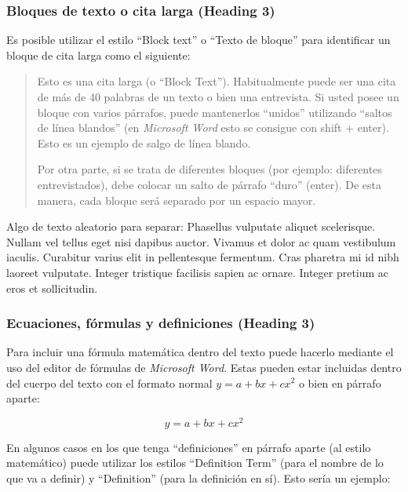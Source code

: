 \documentclass[
    a4paper,%
    DIV=calc,%
    abstract=true%
  ]{scrartcl}%
\begin{document}
  \subsubsection{Bloques de texto o cita larga (Heading
  3)}\label{bloques-de-texto-o-cita-larga-heading-3}

  Es posible utilizar el estilo ``Block text'' o ``Texto de bloque''
  para identificar un bloque de cita larga como el siguiente:

  \begin{quote}
  Esto es una cita larga (o ``Block Text''). Habitualmente puede ser una
  cita de más de 40 palabras de un texto o bien una entrevista. Si usted
  posee un bloque con varios párrafos, puede mantenerlos ``unidos''
  utilizando ``saltos de línea blandos'' (en \emph{Microsoft Word} esto
  se consigue con shift + enter).\\
  Esto es un ejemplo de salgo de línea blando.

  Por otra parte, si se trata de diferentes bloques (por ejemplo:
  diferentes entrevistados), debe colocar un salto de párrafo ``duro''
  (enter). De esta manera, cada bloque será separado por un espacio
  mayor.
  \end{quote}

  Algo de texto aleatorio para separar: Phasellus vulputate aliquet
  scelerisque. Nullam vel tellus eget nisi dapibus auctor. Vivamus et
  dolor ac quam vestibulum iaculis. Curabitur varius elit in
  pellentesque fermentum. Cras pharetra mi id nibh laoreet vulputate.
  Integer tristique facilisis sapien ac ornare. Integer pretium ac eros
  et sollicitudin.

  \subsubsection{Ecuaciones, fórmulas y definiciones (Heading
  3)}\label{ecuaciones-fuxf3rmulas-y-definiciones-heading-3}

  Para incluir una fórmula matemática dentro del texto puede hacerlo
  mediante el uso del editor de fórmulas de \emph{Microsoft Word}. Estas
  pueden estar incluidas dentro del cuerpo del texto con el formato
  normal \(y = a + bx + cx^{2}\) o bien en párrafo aparte:

  \[y = a + bx + cx^{2}\]

  En algunos casos en los que tenga ``definiciones'' en párrafo aparte
  (al estilo matemático) puede utilizar los estilos ``Definition Term''
  (para el nombre de lo que va a definir) y ``Definition'' (para la
  definición en sí). Esto sería un ejemplo:
\end{document}
